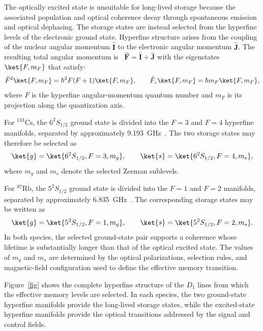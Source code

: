 The optically excited state is unsuitable for long-lived storage because the associated population and optical coherence decay through spontaneous emission and optical dephasing. The storage states are instead selected from the hyperfine levels of the electronic ground state. Hyperfine structure arises from the coupling of the nuclear angular momentum $\hat{\mathbf I}$ to the electronic angular momentum $\hat{\mathbf J}$. The resulting total angular momentum is~\cite{CsDataLineSteck,RbDataLineSteck}
$\hat{\mathbf F}
=
\hat{\mathbf I}
+
\hat{\mathbf J} 
$ with the eigenstates $\ket{F,m_F}$ that satisfy:
\begin{equation}
\hat{F}^{2}\ket{F,m_F}
=
\hbar^{2}F(F+1)\ket{F,m_F},
\qquad
\hat{F}_{z}\ket{F,m_F}
=
\hbar m_F\ket{F,m_F},
\label{eq:hyperfine_angular_momentum}
\end{equation}
where $F$ is the hyperfine angular-momentum quantum number and $m_F$ is its projection along the quantization axis.

For ${}^{133}\mathrm{Cs}$, the $6^2S_{1/2}$ ground state is divided into the $F=3$ and $F=4$ hyperfine manifolds, separated by approximately \SI{9.193}{\giga\hertz}~\cite{CsDataLineSteck}. The two storage states may therefore be selected as
\begin{equation}
\ket{g}
=
\ket{6^2S_{1/2},F=3,m_g},
\qquad
\ket{s}
=
\ket{6^2S_{1/2},F=4,m_s},
\label{eq:cs_memory_states}
\end{equation}
where $m_g$ and $m_s$ denote the selected Zeeman sublevels.

For ${}^{87}\mathrm{Rb}$, the $5^2S_{1/2}$ ground state is divided into the $F=1$ and $F=2$ manifolds, separated by approximately \SI{6.835}{\giga\hertz}~\cite{RbDataLineSteck}. The corresponding storage states may be written as
\begin{equation}
\ket{g}
=
\ket{5^2S_{1/2},F=1,m_g},
\qquad
\ket{s}
=
\ket{5^2S_{1/2},F=2,m_s}.
\label{eq:rb_memory_states}
\end{equation}
In both species, the selected ground-state pair supports a coherence whose lifetime is substantially longer than that of the optical excited state. The values of $m_g$ and $m_s$ are determined by the optical polarizations, selection rules, and magnetic-field configuration used to define the effective memory transition.

Figure~\ref{fig} shows the complete hyperfine structure of the $D_1$ lines from which the effective memory levels are selected. In each species, the two ground-state hyperfine manifolds provide the long-lived storage states, while the excited-state hyperfine manifolds provide the optical transitions addressed by the signal and control fields.


